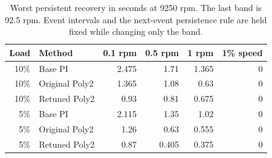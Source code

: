 \begin{table}[htbp]\centering\small
\begin{tabular}{@{}rlrrrr@{}}\toprule
Load & Method & 0.1 rpm & 0.5 rpm & 1 rpm & 1\% speed\\\midrule
10\% & Base PI & 2.475 & 1.71 & 1.365 & 0\\
10\% & Original Poly2 & 1.365 & 1.08 & 0.63 & 0\\
10\% & Retuned Poly2 & 0.93 & 0.81 & 0.675 & 0\\
5\% & Base PI & 2.115 & 1.35 & 1.02 & 0\\
5\% & Original Poly2 & 1.26 & 0.63 & 0.555 & 0\\
5\% & Retuned Poly2 & 0.87 & 0.405 & 0.375 & 0\\
\bottomrule\end{tabular}
\caption{Worst persistent recovery in seconds at 9250 rpm. The last band is 92.5 rpm. Event intervals and the next-event persistence rule are held fixed while changing only the band.}\label{tab:sensitivity_recovery}
\end{table}

